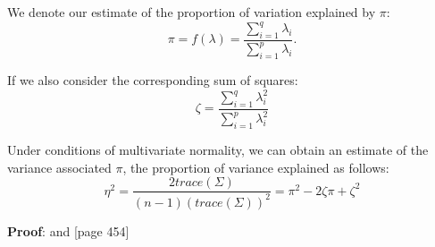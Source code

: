 \begin{theorem}
\label{th:propexpl}

We denote our estimate of the proportion of variation explained by $\pi$:
\begin{displaymath}
\pi = f(\lambda) = \frac{ \sum_{i=1}^{q} \lambda_{i} }{ \sum_{i=1}^{p} \lambda_{i} }.
\end{displaymath}

If we also consider the corresponding sum of squares:
\begin{displaymath}
\zeta = \frac{\sum_{i=1}^{q} \lambda_{i}^{2}}{ \sum_{i=1}^{p} \lambda_{i}^{2}}
\end{displaymath}

Under conditions of multivariate normality, we can obtain an estimate of the variance associated $\pi$, the proportion of variance explained as follows:
\begin{equation}
\eta^{2} = \frac{2 trace(\Sigma)}{(n-1)  (trace(\Sigma))^{2}} = \pi^{2} - 2 \zeta \pi + \zeta^{2}
\end{equation}
\end{theorem}
\textbf{Proof}: \cite{Sugiyama+Tong:1976} and [page 454] \cite{Kshinaragar:1972}
